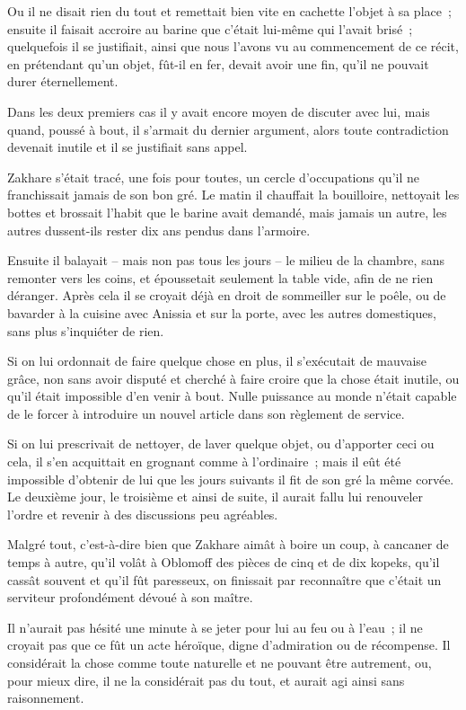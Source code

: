 \documentclass[french,twoside]{book} %
\begin{document}
Ou il ne disait rien du tout et remettait bien vite en cachette l’objet à sa place ; ensuite il faisait accroire au barine que c’était lui-même qui l’avait brisé ; quelquefois il se justifiait, ainsi que nous l’avons vu au commencement de ce récit, en prétendant qu’un objet, fût-il en fer, devait avoir une fin, qu’il ne pouvait durer éternellement.\par
Dans les deux premiers cas il y avait encore moyen de discuter avec lui, mais quand, poussé à bout, il s’armait du dernier argument, alors toute contradiction devenait inutile et il se justifiait sans appel.\par
Zakhare s’était tracé, une fois pour toutes, un cercle d’occupations qu’il ne franchissait jamais de son bon gré. Le matin il chauffait la bouilloire, nettoyait les bottes et brossait l’habit que le barine avait demandé, mais jamais un autre, les autres dussent-ils rester dix ans pendus dans l’armoire.\par
Ensuite il balayait – mais non pas tous les jours – le milieu de la chambre, sans remonter vers les coins, et époussetait seulement la table vide, afin de ne rien déranger. Après cela il se croyait déjà en droit de sommeiller sur le poêle, ou de bavarder à la cuisine avec Anissia et sur la porte, avec les autres domestiques, sans plus s’inquiéter de rien.\par
Si on lui ordonnait de faire quelque chose en plus, il s’exécutait de mauvaise grâce, non sans avoir disputé et cherché à faire croire que la chose était inutile, ou qu’il était impossible d’en venir à bout. Nulle puissance au monde n’était capable de le forcer à introduire un nouvel article dans son règlement de service.\par
Si on lui prescrivait de nettoyer, de laver quelque objet, ou d’apporter ceci ou cela, il s’en acquittait en grognant comme à l’ordinaire ; mais il eût été impossible d’obtenir de lui que les jours suivants il fit de son gré la même corvée. Le deuxième jour, le troisième et ainsi de suite, il aurait fallu lui renouveler l’ordre et revenir à des discussions peu agréables.\par
Malgré tout, c’est-à-dire bien que Zakhare aimât à boire un coup, à cancaner de temps à autre, qu’il volât à Oblomoff des pièces de cinq et de dix kopeks, qu’il cassât souvent et qu’il fût paresseux, on finissait par reconnaître que c’était un serviteur profondément dévoué à son maître.\par
Il n’aurait pas hésité une minute à se jeter pour lui au feu ou à l’eau ; il ne croyait pas que ce fût un acte héroïque, digne d’admiration ou de récompense. Il considérait la chose comme toute naturelle et ne pouvant être autrement, ou, pour mieux dire, il ne la considérait pas du tout, et aurait agi ainsi sans raisonnement.\par
\end{document}
